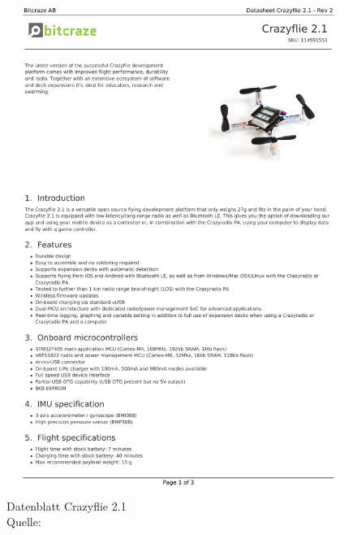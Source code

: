 	\begin{figure}[H]
		\centering
		\includegraphics[page=3,width=.8\textwidth]{anhang/crazyfliedatasheet.pdf}
		\caption{Datenblatt Crazyflie 2.1 \protect \\ Quelle: \cite{.} }
		\label{lab:crazyfliedatasheet.pdf}
	\end{figure}

